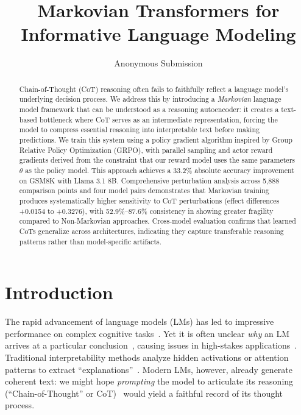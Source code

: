 \documentclass[letterpaper]{article} %
\title{Markovian Transformers for Informative Language Modeling}
\author{
    Anonymous Submission
}
\begin{document}
\maketitle

\begin{abstract}
  Chain-of-Thought (CoT) reasoning often fails to faithfully reflect a language model's underlying decision process. We address this by introducing a \emph{Markovian} language model framework that can be understood as a reasoning autoencoder: it creates a text-based bottleneck where CoT serves as an intermediate representation, forcing the model to compress essential reasoning into interpretable text before making predictions. We train this system using a policy gradient algorithm inspired by Group Relative Policy Optimization (GRPO), with parallel sampling and actor reward gradients derived from the constraint that our reward model uses the same parameters $\theta$ as the policy model. This approach achieves a 33.2\% absolute accuracy improvement on GSM8K with Llama 3.1 8B. Comprehensive perturbation analysis across 5,888 comparison points and four model pairs demonstrates that Markovian training produces systematically higher sensitivity to CoT perturbations (effect differences +0.0154 to +0.3276), with 52.9\%--87.6\% consistency in showing greater fragility compared to Non-Markovian approaches. Cross-model evaluation confirms that learned CoTs generalize across architectures, indicating they capture transferable reasoning patterns rather than model-specific artifacts.
\
\end{abstract}


\section{Introduction}
\label{sec:intro}
The rapid advancement of language models (LMs) has led to impressive performance on complex cognitive tasks~\citep{NEURIPS2020_1457c0d6}. Yet it is often unclear \emph{why} an LM arrives at a particular conclusion~\citep{lamparth2023analyzing,burns2024discovering,gurnee2024language}, causing issues in high-stakes applications~\citep{Grabb2024.04.07.24305462,lamparth2024human,rivera2024escalation}. Traditional interpretability methods analyze hidden activations or attention patterns to extract ``explanations''~\citep{geiger2022inducing,geva2022transformer,meng2022locating,raukur2022toward,wang2022interpretability,lamparth2023analyzing,nanda2023progress}. Modern LMs, however, already generate coherent text: we might hope \emph{prompting} the model to articulate its reasoning (``Chain-of-Thought'' or CoT)~\citep{nye2022show,wei2022chain} would yield a faithful record of its thought process. 
\end{document}
